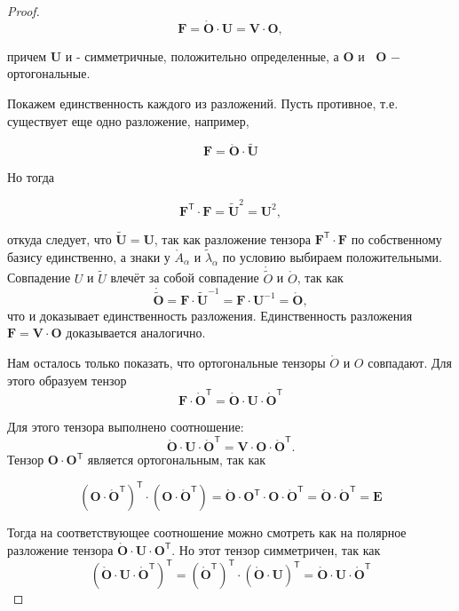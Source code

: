 \begin{proof}
\[
\mathbf{F}=\mathring{\mathbf{O}} \cdot \mathbf{U}=\mathbf{V} \cdot \mathbf{O},
\]

причем $\mathbf{U}$ и  - симметричные, положительно определенные, а $\mathbf{O}$ и $\mathbf{\text { O }}-$ ортогональные.

Покажем единственность каждого из разложений. Пусть противное, т.е. существует еще одно разложение, например,

\[
\mathbf{F}=\mathring{\mathbf{O}} \cdot \widetilde{\mathbf{U}}
\]

Но тогда

\[
\mathbf{F}^{\mathsf{T}} \cdot \mathbf{F}=\widetilde{\mathbf{U}}^{2}=\mathbf{U}^{2},
\]

откуда следует, что $\widetilde{\mathbf{U}}=\mathbf{U}$, так как разложение
тензора $\mathbf{F}^{\mathsf{T}} \cdot \mathbf{F}$ по собственному базису
единственно, а знаки у $\mathring{A}_{\alpha}$ и $\widetilde{\lambda}_{\alpha}$
по условию выбираем положительными. Совпадение $ U $ и $ \widetilde U $ влечёт
за собой совпадение $ \mathring{\widetilde{O}} $ и $ \mathring{O} $, так как
\[
  \mathring{\widetilde{\mathbf{O}}}=\mathbf{F} \cdot
  \widetilde{\mathbf{U}}^{-1}=\mathbf{F}
\cdot \mathbf{U}^{-1}=\mathring{\mathbf{O}},
\]
что и доказывает единственность разложения. Единственность разложения $\mathbf{F}=\mathbf{V} \cdot \mathbf{O}$ доказывается аналогично.

Нам осталось только показать, что ортогональные тензоры $ \mathring{O} $ и $ O $
совпадают. Для этого образуем тензор
\[
\mathbf{F} \cdot \mathring{\mathbf{O}}^{\mathsf{T}}=\mathring{\mathbf{O}} \cdot \mathbf{U} \cdot \mathring{\mathbf{O}}^{\mathsf{T}}
\]

Для этого тензора выполнено соотношение:
\[
  \mathring{\mathbf{O}} \cdot \mathbf{U} \cdot \mathring{\mathbf{O}}^{\mathsf{T}}=\mathbf{V} \cdot \mathbf{O} \cdot \mathring{\mathbf{O}}^{\mathsf{T}} .
\]
Тензор $ \mathbf{O} \cdot \mathbf{O}^{\mathsf{T}}$ является ортогональным, так как

\[
\left(\mathbf{O} \cdot \mathring{\mathbf{O}}^{\mathsf{T}}\right)^{\mathsf{T}} \cdot\left(\mathbf{O} \cdot \mathring{\mathbf{O}}^{\mathsf{T}}\right)=\mathring{\mathbf{O}} \cdot \mathbf{O}^{\mathsf{T}} \cdot \mathbf{O} \cdot \mathring{\mathbf{O}}^{\mathsf{T}}=\mathring{\mathbf{O}} \cdot \mathring{\mathbf{O}}^{\mathsf{T}}=\mathbf{E}
\]

Тогда на соответствующее соотношение можно смотреть как на полярное разложение тензора $\mathring{\mathbf{O}} \cdot \mathbf{U} \cdot \mathbf{O}^{\mathsf{T}}$. Но этот тензор симметричен, так как
\[
\left(\mathring{\mathbf{O}} \cdot \mathbf{U} \cdot \mathring{\mathbf{O}}^{\mathsf{T}}\right)^{\mathsf{T}}=\left(\mathring{\mathbf{O}}^{\mathsf{T}}\right)^{\mathsf{T}} \cdot(\mathring{\mathbf{O}} \cdot \mathbf{U})^{\mathsf{T}}=\mathring{\mathbf{O}} \cdot \mathbf{U} \cdot \mathring{\mathbf{O}}^{\mathsf{T}}
\]


\end{proof}
